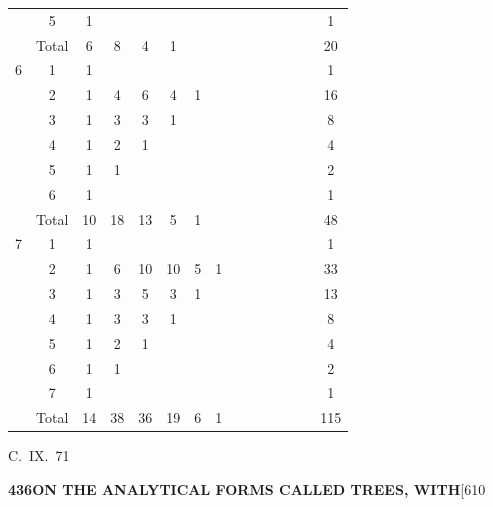 \documentclass[11pt,a4paper]{article}
\begin{document}
{\begin{center}
\begin{longtable}{|c|c|c|c|c|c|c|c|c|c|c|c|c|c|c|}
  & 5 & 1 & & & & & & & & & & & & 1 \\
  & Total & 6 & 8 & 4 & 1 & & & & & & & & & 20 \\
\hline
6 & 1 & 1 & & & & & & & & & & & & 1 \\
  & 2 & 1 & 4 & 6 & 4 & 1 & & & & & & & & 16 \\
  & 3 & 1 & 3 & 3 & 1 & & & & & & & & & 8 \\
  & 4 & 1 & 2 & 1 & & & & & & & & & & 4 \\
  & 5 & 1 & 1 & & & & & & & & & & & 2 \\
  & 6 & 1 & & & & & & & & & & & & 1 \\
  & Total & 10 & 18 & 13 & 5 & 1 & & & & & & & & 48 \\
\hline
7 & 1 & 1 & & & & & & & & & & & & 1 \\
  & 2 & 1 & 6 & 10 & 10 & 5 & 1 & & & & & & & 33 \\
  & 3 & 1 & 3 & 5 & 3 & 1 & & & & & & & & 13 \\
  & 4 & 1 & 3 & 3 & 1 & & & & & & & & & 8 \\
  & 5 & 1 & 2 & 1 & & & & & & & & & & 4 \\
  & 6 & 1 & 1 & & & & & & & & & & & 2 \\
  & 7 & 1 & & & & & & & & & & & & 1 \\
  & Total & 14 & 38 & 36 & 19 & 6 & 1 & & & & & & & 115 \\
\hline
\end{longtable}
\end{center}
\hfill C.~IX.\ 71

\newpage
\noindent\textbf{436}\hspace{\fill}\textbf{ON THE ANALYTICAL FORMS CALLED TREES, WITH}\hspace{\fill}[610

}
\end{document}
